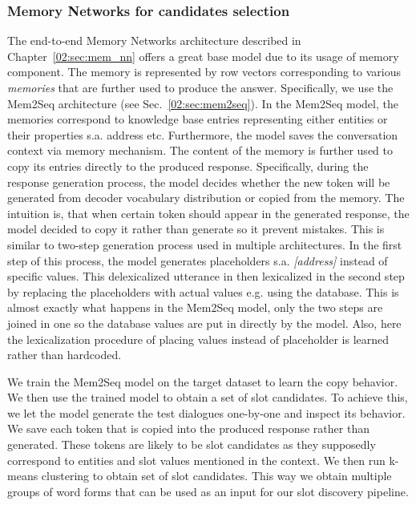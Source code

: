 \subsubsection{Memory Networks for candidates selection}
The end-to-end Memory Networks architecture described in Chapter~\ref{02:sec:mem_nn} offers a great base model due to its usage of memory component.
The memory is represented by row vectors corresponding to various \emph{memories} that are further used to produce the answer.
Specifically, we use the Mem2Seq architecture (see Sec.~\ref{02:sec:mem2seq}).
In the Mem2Seq model, the memories correspond to knowledge base entries representing either entities or their properties s.a. address etc.
Furthermore, the model saves the conversation context via memory mechanism.
The content of the memory is further used to copy its entries directly to the produced response.
Specifically, during the response generation process, the model decides whether the new token will be generated from decoder vocabulary distribution or copied from the memory.
The intuition is, that when certain token should appear in the generated response, the model decided to copy it rather than generate so it prevent mistakes.
This is similar to two-step generation process used in multiple architectures.
In the first step of this process, the model generates placeholders s.a. \emph{[address]} instead of specific values.
This delexicalized utterance in then lexicalized in the second step by replacing the placeholders with actual values  e.g. using the database.
This is almost exactly what happens in the Mem2Seq model, only the two steps are joined in one so the database values are put in directly by the model.
Also, here the lexicalization procedure of placing values instead of placeholder is learned rather than hardcoded.

We train the Mem2Seq model on the target dataset to learn the copy behavior.
We then use the trained model to obtain a set of slot candidates.
To achieve this, we let the model generate the test dialogues one-by-one and inspect its behavior.
We save each token that is copied into the produced response rather than generated.
These tokens are likely to be slot candidates as they supposedly correspond to entities and slot values mentioned in the context.
We then run k-means clustering to obtain set of slot candidates.
This way we obtain multiple groups of word forms that can be used as an input for our slot discovery pipeline.

